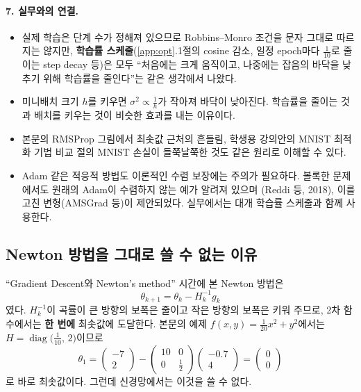 \documentclass[11pt,a4paper]{article}
\begin{document}
\paragraph{7. 실무와의 연결.}
\begin{itemize}[leftmargin=1.8em]
\item 실제 학습은 단계 수가 정해져 있으므로 Robbins--Monro 조건을 문자 그대로 따르지는 않지만,
\textbf{학습률 스케줄}(\ref{app:opt}.1절의 cosine 감소, 일정 epoch마다 $\frac1{10}$로 줄이는 step decay 등)은
모두 ``처음에는 크게 움직이고, 나중에는 잡음의 바닥을 낮추기 위해 학습률을 줄인다''는 같은 생각에서 나왔다.
\item 미니배치 크기 $h$를 키우면 $\sigma^2\propto\frac1h$가 작아져 바닥이 낮아진다.
학습률을 줄이는 것과 배치를 키우는 것이 비슷한 효과를 내는 이유이다.
\item 본문의 RMSProp 그림에서 최솟값 근처의 흔들림, 학생용 강의안의 MNIST 최적화 기법 비교 절의 MNIST 손실이 들쭉날쭉한 것도
같은 원리로 이해할 수 있다.
\item Adam 같은 적응적 방법도 이론적인 수렴 보장에는 주의가 필요하다.
볼록한 문제에서도 원래의 Adam이 수렴하지 않는 예가 알려져 있으며 (Reddi 등, 2018),
이를 고친 변형(AMSGrad 등)이 제안되었다. 실무에서는 대개 학습률 스케줄과 함께 사용한다.
\end{itemize}

\subsection{Newton 방법을 그대로 쓸 수 없는 이유}

``Gradient Descent와 Newton's method'' 시간에 본 Newton 방법은
\[
\theta_{k+1}=\theta_k-H_k^{-1}g_k
\]
였다. $H_k^{-1}$이 곡률이 큰 방향의 보폭은 줄이고 작은 방향의 보폭은 키워 주므로,
2차 함수에서는 \textbf{한 번에} 최솟값에 도달한다.
본문의 예제 $f(x,y)=\frac{1}{20}x^2+y^2$에서는 $H=\operatorname{diag}\bigl(\frac{1}{10},\,2\bigr)$이므로
\[
\theta_1=\begin{pmatrix}-7\\2\end{pmatrix}-\begin{pmatrix}10&0\\0&\tfrac12\end{pmatrix}\begin{pmatrix}-0.7\\4\end{pmatrix}
=\begin{pmatrix}0\\0\end{pmatrix}
\]
로 바로 최솟값이다. 그런데 신경망에서는 이것을 쓸 수 없다.
\end{document}
